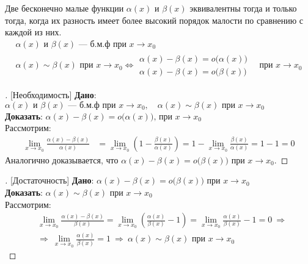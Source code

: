 \begin{theorem}
  Две бесконечно малые функции $\alpha(x)$ и $\beta(x)$ эквивалентны тогда и только тогда, когда их разность имеет более высокий порядок малости по сравнению с каждой из них.
  \begin{gather*}
    \alpha(x) \text{ и } \beta(x) \text{ --- б.м.ф при } x \to x_0 \\
    \alpha(x) \sim \beta(x) \text{ при } x\to x_0 \iff 
    \begin{matrix}
    \alpha(x) - \beta(x) = o\big(\alpha(x)\big) \\
    \alpha(x) - \beta(x) = o\big(\beta(x)\big)
    \end{matrix}
    \quad \text{при } x \to x_0
  \end{gather*}
\end{theorem}
\begin{proof}[][Необходимость]
  \textbf{Дано}: $\alpha(x) \text{ и } \beta(x) \text{ --- б.м.ф при } x \to x_0,\quad \alpha(x) \sim \beta(x) \text{ при }  x\to x_0$\\
  \textbf{Доказать}: $\alpha(x) - \beta(x) = o\big(\alpha(x)\big) \text{, при } x \to x_0$ \\
  Рассмотрим:
  \begin{align*}
    \lim_{x \to x_0} \frac{\alpha(x) - \beta(x)}{\alpha(x)} &= \lim_{x \to x_0} \left( 1 - \frac{\beta(x)}{\alpha(x)} \right) = 1 - \lim_{x \to x_0} \frac{\beta(x)}{\alpha(x)} = 1 - 1 = 0
  \end{align*}
  Аналогично доказывается, что $\alpha(x) - \beta(x) = o\big(\beta(x)\big)$ при $x\to x_0$.
\end{proof}
\begin{proof}[][Достаточность]
  \textbf{Дано}: $\alpha(x) - \beta(x) = o\big(\beta(x)\big) \text{ при } x \to x_0$ \\
  \textbf{Доказать}: $\alpha(x) \sim \beta(x) \text{ при } x \to x_0$ \\
  Рассмотрим:
  \begin{align*}
    &\lim_{x \to x_0} \frac{\alpha(x) - \beta(x)}{\beta(x)} = \lim_{x \to x_0} \left( \frac{\alpha(x)}{\beta(x)} - 1 \right) = \lim_{x \to x_0} \frac{\alpha(x)}{\beta(x)} - 1 = 0\ \Rightarrow \\
    &\Rightarrow\ \lim_{x \to x_0} \frac{\alpha(x)}{\beta(x)} = 1\ \Rightarrow\ \alpha(x) \sim \beta(x) \text{ при } x \to x_0 
  \end{align*}
\end{proof}

